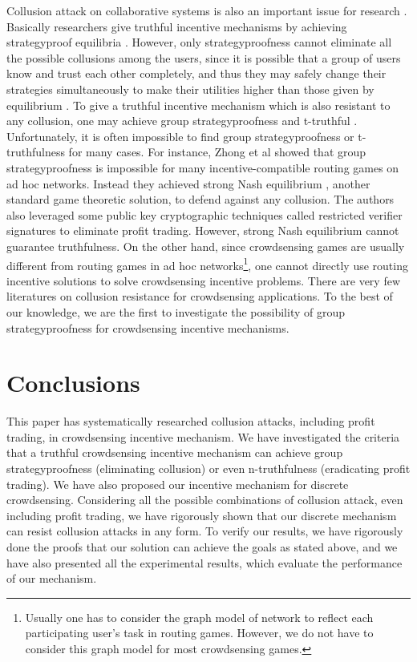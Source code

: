\documentclass[conference]{IEEEtran}
\theoremstyle{definition}
\begin{document}
Collusion attack on collaborative systems is also an important issue for research \cite{feng2013imac, chen2013sparc, zhong2007designing, zheng2014strategy}. Basically researchers give truthful incentive mechanisms by achieving strategyproof equilibria \cite{feng2013imac}. However, only strategyproofness cannot eliminate all the possible collusions among the users, since it is possible that a group of users know and trust each other completely, and thus they may safely change their strategies simultaneously to make their utilities higher than those given by equilibrium \cite{goldberg2005collusion, zhong2007designing}. To give a truthful incentive mechanism which is also resistant to any collusion, one may achieve group strategyproofness \cite{jain1999group, mas1995microeconomic} and t-truthful \cite{goldberg2005collusion,goldberg2003competitiveness}. Unfortunately, it is often impossible to find group strategyproofness or t-truthfulness for many cases. For instance, Zhong et al \cite{zhong2007designing} showed that group strategyproofness is impossible for many incentive-compatible routing games on ad hoc networks. Instead they achieved strong Nash equilibrium \cite{aumann1959acceptable, mas1995microeconomic}, another standard game theoretic solution, to defend against any collusion. The authors also leveraged some public key cryptographic techniques called restricted verifier signatures to eliminate profit trading. However, strong Nash equilibrium cannot guarantee truthfulness. On the other hand, since crowdsensing games are usually different from routing games in ad hoc networks\footnote{Usually one has to consider the graph model of network to reflect each participating user's task in routing games. However, we do not have to consider this graph model for most crowdsensing games.}, one cannot directly use routing incentive solutions to solve crowdsensing incentive problems. There are very few literatures on collusion resistance for crowdsensing applications. To the best of our knowledge, we are the first to investigate the possibility of group strategyproofness for crowdsensing incentive mechanisms.

\section{Conclusions}
\label{sec:con}
This paper has systematically researched collusion attacks, including profit trading, in crowdsensing incentive mechanism. We have investigated the criteria that a truthful crowdsensing incentive mechanism can achieve group strategyproofness (eliminating collusion) or even n-truthfulness (eradicating profit trading). We have also proposed our incentive mechanism for discrete crowdsensing. {\color{blue}Considering all the possible combinations of collusion attack, even including profit trading, we have rigorously shown that our discrete mechanism can resist collusion attacks in any form.} To verify our results, we have rigorously done the proofs that our solution can achieve the goals as stated above, and we have also presented all the experimental results, {\color{blue}which evaluate the performance of our mechanism.}
\end{document}
